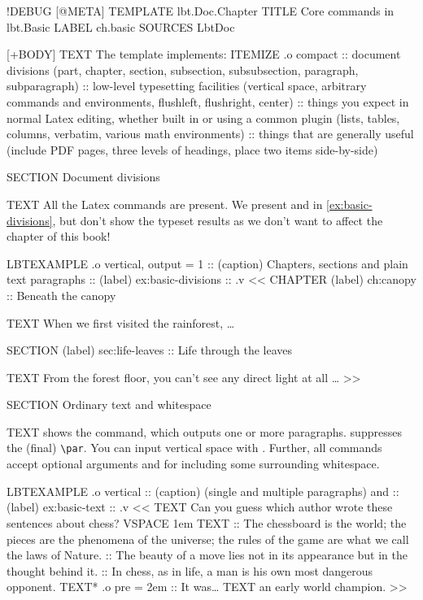 \begin{lbt}
  !DEBUG
  [@META]
    TEMPLATE lbt.Doc.Chapter
    TITLE Core commands in lbt.Basic
    LABEL ch.basic
    SOURCES LbtDoc

  [+BODY]
    TEXT The  template implements:
    ITEMIZE .o compact
    :: document divisions (part, chapter, section, subsection, subsubsection, paragraph, subparagraph)
    :: low-level typesetting facilities (vertical space, arbitrary commands and environments, flushleft, flushright, center)
    :: things you expect in normal Latex editing, whether built in or using a common plugin (lists, tables, columns, verbatim, various math environments)
    :: things that are generally useful (include PDF pages, three levels of headings, place two items side-by-side)

    SECTION Document divisions

    TEXT All the Latex commands are present. We present  and  in \cref{ex:basic-divisions}, but don't show the typeset results as we don't want to affect the chapter of this book!

    LBTEXAMPLE .o vertical, output = 1
    :: (caption) Chapters, sections and plain text paragraphs
    :: (label) ex:basic-divisions
    :: .v <<
      CHAPTER (label) ch:canopy :: Beneath the canopy

      TEXT When we first visited the rainforest, \dots

      SECTION (label) sec:life-leaves :: Life through the leaves

      TEXT From the forest floor, you can't see any direct light at all \dots
    >>

    SECTION Ordinary text and whitespace

    TEXT  shows the  command, which outputs one or more paragraphs.  suppresses the (final) \verb|\par|. You can input vertical space with . Further, all commands accept optional arguments  and  for including some surrounding whitespace.

    LBTEXAMPLE .o vertical
    :: (caption)  (single and multiple paragraphs) and 
    :: (label) ex:basic-text
    :: .v <<
      TEXT Can you guess which author wrote these sentences about chess?
      VSPACE 1em
      TEXT
      :: The chessboard is the world; the pieces are the phenomena of the universe; the rules of the game are what we call the laws of Nature.
      :: The beauty of a move lies not in its appearance but in the thought behind it.
      :: In chess, as in life, a man is his own most dangerous opponent.
      TEXT* .o pre = 2em :: It was\dots
      TEXT an early world champion.
    >>


\end{lbt}

